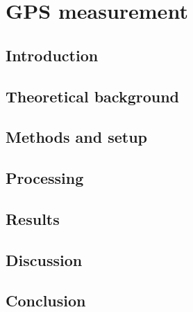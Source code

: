 

\renewcommand{\chapterauthor}{Moritz Bitterling, Linda Thielke, Julien Weihs}
\chapter{GPS measurement}
\label{gpsmeas}

\begin{abstract}

\end{abstract}


\section{Introduction}


\section{Theoretical background} \label{GPS:sec:Theoretical backround}


\section{Methods and setup} \label{GPS:sec:Methods and setup}


\section{Processing} \label{GPS:sec:Processing}


\section{Results} \label{GPS:sec:Results}


\section{Discussion} \label{GPS:sec:Discussion}


\section{Conclusion}




